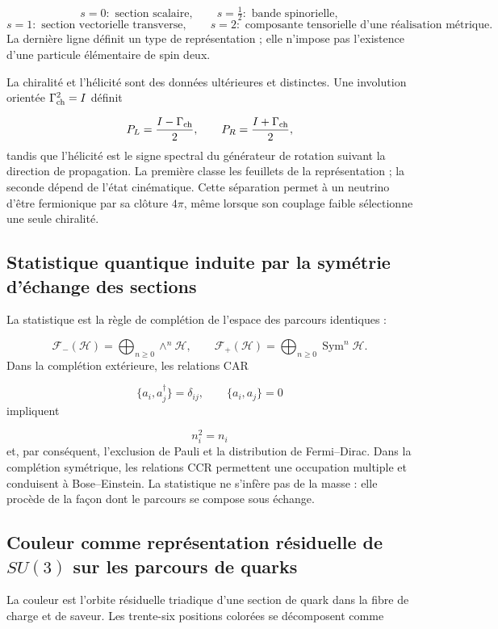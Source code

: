 \[
 s=0:\text{ section scalaire},\qquad
 s=\tfrac12:\text{ bande spinorielle},
\]
\[
 s=1:\text{ section vectorielle transverse},\qquad
 s=2:\text{ composante tensorielle d'une réalisation métrique}.
\]
La dernière ligne définit un type de représentation ; elle n'impose pas l'existence d'une particule élémentaire de spin deux.

La chiralité et l'hélicité sont des données ultérieures et distinctes. Une involution orientée \(\Gamma_{\rm ch}^2=I\) définit

\[
 P_L=\frac{I-\Gamma_{\rm ch}}2,
 \qquad
 P_R=\frac{I+\Gamma_{\rm ch}}2,
\]
tandis que l'hélicité est le signe spectral du générateur de rotation suivant la direction de propagation. La première classe les feuillets de la représentation ; la seconde dépend de l'état cinématique. Cette séparation permet à un neutrino d'être fermionique par sa clôture \(4\pi\), même lorsque son couplage faible sélectionne une seule chiralité.

\subsection{Statistique quantique induite par la symétrie d'échange des sections}
La statistique est la règle de complétion de l'espace des parcours identiques :

\[
 \mathcal F_-(\mathcal H)
 =\bigoplus_{n\ge0}\wedge^n\mathcal H,\qquad
 \mathcal F_+(\mathcal H)
 =\bigoplus_{n\ge0}\operatorname{Sym}^n\mathcal H.
\]
Dans la complétion extérieure, les relations CAR

\[
 \{a_i,a_j^\dagger\}=\delta_{ij},\qquad
 \{a_i,a_j\}=0
\]
impliquent

\[
 n_i^2=n_i
\]
et, par conséquent, l'exclusion de Pauli et la distribution de Fermi--Dirac. Dans la complétion symétrique, les relations CCR permettent une occupation multiple et conduisent à Bose--Einstein. La statistique ne s'infère pas de la masse : elle procède de la façon dont le parcours se compose sous échange.

\subsection{Couleur comme représentation résiduelle de \(SU(3)\) sur les parcours de quarks}
La couleur est l'orbite résiduelle triadique d'une section de quark dans la fibre de charge et de saveur. Les trente-six positions colorées se décomposent comme

